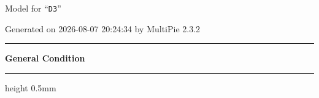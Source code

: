 \documentclass[fleqn,10pt,landscape]{jsarticle}
\begin{document}
\setcounter{MaxMatrixCols}{32}

\renewcommand{\tablename}{Table~}
\renewcommand{\figurename}{Figure~}
\setlength{\baselineskip}{16pt}
\setlength{\parindent}{0pt}
\setlength{\mathindent}{0pt}
\footnotesize
\begin{center}
\LARGE
Model for ``\texttt{D3}''
\end{center}
\begin{flushright}
Generated on 2026-08-07 20:24:34 by MultiPie 2.3.2
\end{flushright}
\setlength{\baselineskip}{16pt}
\footnotesize
\vspace{5mm}
\noindent \rule[0.5mm]{5mm}{0.5mm}\hspace{3mm}\textbf{General Condition}\hspace{3mm}\leaders\hrule height 0.5mm\hfill\kern0pt
\vspace{3mm}
\end{document}
